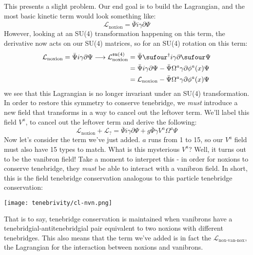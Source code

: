 This presents a slight problem. Our end goal is to build the Lagrangian, and the most basic kinetic term would look something like:
\[
  \mathcal{L}_{\text{noxion}} = \bar{\Psi} i \gamma \partial \Psi
\]
However, looking at an SU(4) transformation happening on this term, the derivative now acts on our SU(4) matrices, so for an SU(4) rotation on this term:
\begin{align*}
  \mathcal{L}_{\text{noxion}} = \bar{\Psi} i \gamma \partial \Psi
  \longrightarrow \mathcal{L}^{\mathfrak{su}(4)}_{\text{noxion}}
   & = \bar{\Psi} \sufour^{\dag} i \gamma \partial \sufour \Psi                               \\
   & = \bar{\Psi} i \gamma \partial \Psi  - \bar{\Psi}\Omega^{a}\gamma\partial \phi^a(x) \Psi \\
   & = \mathcal{L}_{\text{noxion}} - \bar{\Psi}\Omega^{a}\gamma\partial \phi^a(x) \Psi
\end{align*}
we see that this Lagrangian is no longer invariant under an SU(4) transformation. In order to restore this symmetry to conserve tenebridge, we \textit{must} introduce a new field that transforms in a way to cancel out the leftover term. We'll label this field \(V^a\), to cancel out the leftover term and derive the following:
\[
  \mathcal{L}_{\text{noxion}} + \mathcal{L}_{?} = \bar{\Psi} i \gamma \partial \Psi + g\bar{\Psi}\gamma V^{a} \Omega^{a} \Psi
\]
Now let's consider the term we've just added. \(a\) runs from 1 to 15, so our \(V^a\) field must also have 15 types to match. What is this mysterious \(V^a\)? Well, it turns out to be the vanibron field! Take a moment to interpret this - in order for noxions to conserve tenebridge, they \textit{must} be able to interact with a vanibron field. In short, this is the field tenebridge conservation analogous to this particle tenebridge conservation:
\begin{center}
  \texttt{[image: tenebrivity/cl-nvn.png]}
\end{center}
That is to say, tenebridge conservation is maintained when vanibrons have a tenebridgial-antitenebridgial pair equivalent to two noxions with different tenebridges. This also means that the term we've added is in fact the \(\mathcal{L}_{\text{nox-van-nox}}\), the Lagrangian for the interaction between noxions and vanibrons.

